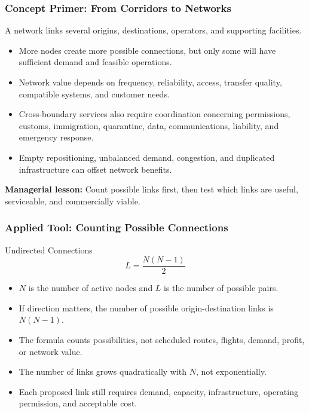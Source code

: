\documentclass{beamer}
\begin{document}
\begin{frame}[t]
\frametitle{Concept Primer: From Corridors to Networks}
A network links several origins, destinations, operators, and supporting facilities.
\begin{itemize}
\item More nodes create more possible connections, but only some will have sufficient demand and feasible operations.
\item Network value depends on frequency, reliability, access, transfer quality, compatible systems, and customer needs.
\item Cross-boundary services also require coordination concerning permissions, customs, immigration, quarantine, data, communications, liability, and emergency response.
\item Empty repositioning, unbalanced demand, congestion, and duplicated infrastructure can offset network benefits.
\end{itemize}
\textbf{Managerial lesson:} Count possible links first, then test which links are useful, serviceable, and commercially viable.
\end{frame}

\begin{frame}[t]
\frametitle{Applied Tool: Counting Possible Connections}
\begin{block}{Undirected Connections}
\[
L=\frac{N(N-1)}{2}
\]
\end{block}
\begin{itemize}
\item $N$ is the number of active nodes and $L$ is the number of possible pairs.
\item If direction matters, the number of possible origin-destination links is $N(N-1)$.
\item The formula counts possibilities, not scheduled routes, flights, demand, profit, or network value.
\item The number of links grows quadratically with $N$, not exponentially.
\item Each proposed link still requires demand, capacity, infrastructure, operating permission, and acceptable cost.
\end{itemize}
\end{frame}
\end{document}
